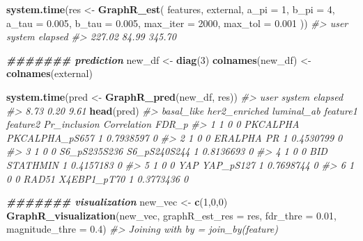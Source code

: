 \documentclass[
]{article}
\newenvironment{Shaded}{\begin{snugshade}}{\end{snugshade}}
\newcommand{\AttributeTok}[1]{\textcolor[rgb]{0.13,0.29,0.53}{#1}}
\newcommand{\CommentTok}[1]{\textcolor[rgb]{0.56,0.35,0.01}{\textit{#1}}}
\newcommand{\DecValTok}[1]{\textcolor[rgb]{0.00,0.00,0.81}{#1}}
\newcommand{\DocumentationTok}[1]{\textcolor[rgb]{0.56,0.35,0.01}{\textbf{\textit{#1}}}}
\newcommand{\FloatTok}[1]{\textcolor[rgb]{0.00,0.00,0.81}{#1}}
\newcommand{\FunctionTok}[1]{\textcolor[rgb]{0.13,0.29,0.53}{\textbf{#1}}}
\newcommand{\NormalTok}[1]{#1}
\newcommand{\OtherTok}[1]{\textcolor[rgb]{0.56,0.35,0.01}{#1}}
\begin{document}
\begin{Shaded}
\begin{Highlighting}[]
\FunctionTok{system.time}\NormalTok{(res }\OtherTok{\textless{}{-}} \FunctionTok{GraphR\_est}\NormalTok{(}
\NormalTok{  features,}
\NormalTok{  external,}
  \AttributeTok{a\_pi =} \DecValTok{1}\NormalTok{,}
  \AttributeTok{b\_pi =} \DecValTok{4}\NormalTok{,}
  \AttributeTok{a\_tau =} \FloatTok{0.005}\NormalTok{,}
  \AttributeTok{b\_tau =} \FloatTok{0.005}\NormalTok{,}
  \AttributeTok{max\_iter =} \DecValTok{2000}\NormalTok{,}
  \AttributeTok{max\_tol =} \FloatTok{0.001}
\NormalTok{))}
\CommentTok{\#\textgreater{}    user  system elapsed }
\CommentTok{\#\textgreater{}  227.02   84.99  345.70}

\DocumentationTok{\#\#\#\#\#\#\# prediction}
\NormalTok{new\_df }\OtherTok{\textless{}{-}} \FunctionTok{diag}\NormalTok{(}\DecValTok{3}\NormalTok{)}
\FunctionTok{colnames}\NormalTok{(new\_df) }\OtherTok{\textless{}{-}} \FunctionTok{colnames}\NormalTok{(external)}

\FunctionTok{system.time}\NormalTok{(pred }\OtherTok{\textless{}{-}} \FunctionTok{GraphR\_pred}\NormalTok{(new\_df, res))}
\CommentTok{\#\textgreater{}    user  system elapsed }
\CommentTok{\#\textgreater{}    8.73    0.20    9.61}
\FunctionTok{head}\NormalTok{(pred)}
\CommentTok{\#\textgreater{}   basal\_like her2\_enriched luminal\_ab     feature1       feature2 Pr\_inclusion Correlation FDR\_p}
\CommentTok{\#\textgreater{} 1          1             0          0     PKCALPHA PKCALPHA\_pS657            1   0.7938597     0}
\CommentTok{\#\textgreater{} 2          1             0          0      ERALPHA             PR            1   0.4530799     0}
\CommentTok{\#\textgreater{} 3          1             0          0 S6\_pS235S236   S6\_pS240S244            1   0.8136693     0}
\CommentTok{\#\textgreater{} 4          1             0          0          BID       STATHMIN            1   0.4157183     0}
\CommentTok{\#\textgreater{} 5          1             0          0          YAP      YAP\_pS127            1   0.7698744     0}
\CommentTok{\#\textgreater{} 6          1             0          0        RAD51    X4EBP1\_pT70            1   0.3773436     0}

\DocumentationTok{\#\#\#\#\#\#\# visualization}
\NormalTok{new\_vec }\OtherTok{\textless{}{-}} \FunctionTok{c}\NormalTok{(}\DecValTok{1}\NormalTok{,}\DecValTok{0}\NormalTok{,}\DecValTok{0}\NormalTok{)}
\FunctionTok{GraphR\_visualization}\NormalTok{(new\_vec, }\AttributeTok{graphR\_est\_res =}\NormalTok{ res,}
                     \AttributeTok{fdr\_thre =} \FloatTok{0.01}\NormalTok{, }\AttributeTok{magnitude\_thre =} \FloatTok{0.4}\NormalTok{)}
\CommentTok{\#\textgreater{} Joining with \textasciigrave{}by = join\_by(feature)\textasciigrave{}}
\end{Highlighting}
\end{Shaded}
\end{document}
